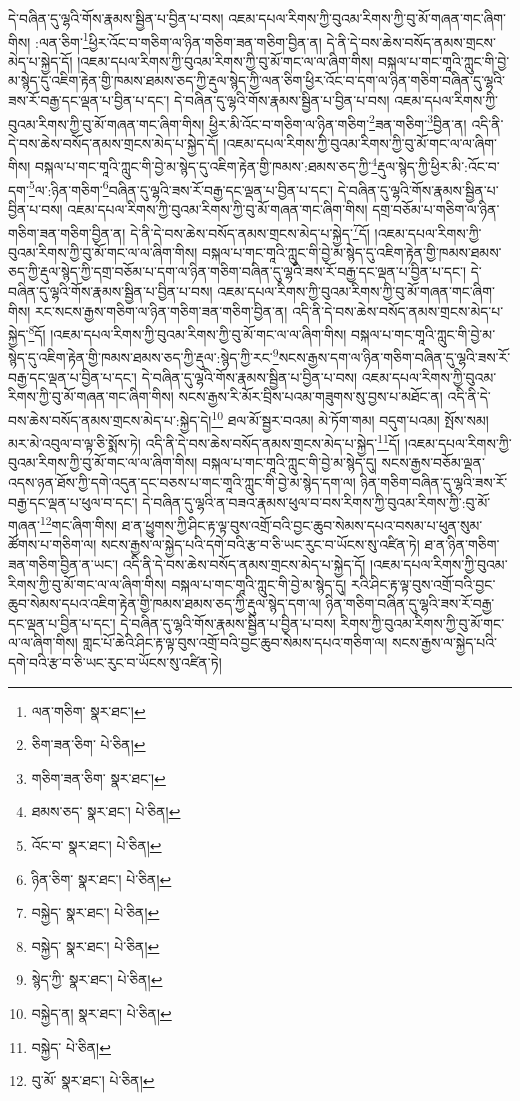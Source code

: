 དེ་བཞིན་དུ་ལྷའི་གོས་རྣམས་སྦྱིན་པ་བྱིན་པ་བས། འཇམ་དཔལ་རིགས་ཀྱི་བུའམ་རིགས་ཀྱི་བུ་མོ་གཞན་གང་ཞིག་གིས། :ལན་ཅིག་\footnote{ལན་གཅིག་  སྣར་ཐང་། }ཕྱིར་འོང་བ་གཅིག་ལ་ཉིན་གཅིག་ཟན་གཅིག་བྱིན་ན། དེ་ནི་དེ་བས་ཆེས་བསོད་ནམས་གྲངས་མེད་པ་སྐྱེད་དོ། །འཇམ་དཔལ་རིགས་ཀྱི་བུའམ་རིགས་ཀྱི་བུ་མོ་གང་ལ་ལ་ཞིག་གིས། བསྐལ་པ་གང་གཱའི་ཀླུང་གི་བྱེ་མ་སྙེད་དུ་འཇིག་རྟེན་གྱི་ཁམས་ཐམས་ཅད་ཀྱི་རྡུལ་སྙེད་ཀྱི་ལན་ཅིག་ཕྱིར་འོང་བ་དག་ལ་ཉིན་གཅིག་བཞིན་དུ་ལྷའི་ཟས་རོ་བརྒྱ་དང་ལྡན་པ་བྱིན་པ་དང་། དེ་བཞིན་དུ་ལྷའི་གོས་རྣམས་སྦྱིན་པ་བྱིན་པ་བས། འཇམ་དཔལ་རིགས་ཀྱི་བུའམ་རིགས་ཀྱི་བུ་མོ་གཞན་གང་ཞིག་གིས། ཕྱིར་མི་འོང་བ་གཅིག་ལ་ཉིན་གཅིག་\footnote{ཅིག་ཟན་ཅིག་  པེ་ཅིན། }ཟན་གཅིག་\footnote{གཅིག་ཟན་ཅིག་  སྣར་ཐང་། }བྱིན་ན། འདི་ནི་དེ་བས་ཆེས་བསོད་ནམས་གྲངས་མེད་པ་སྐྱེད་དོ། །འཇམ་དཔལ་རིགས་ཀྱི་བུའམ་རིགས་ཀྱི་བུ་མོ་གང་ལ་ལ་ཞིག་གིས། བསྐལ་པ་གང་གཱའི་ཀླུང་གི་བྱེ་མ་སྙེད་དུ་འཇིག་རྟེན་གྱི་ཁམས་:ཐམས་ཅད་ཀྱི་\footnote{ཐམས་ཅད་  སྣར་ཐང་།  པེ་ཅིན། }རྡུལ་སྙེད་ཀྱི་ཕྱིར་མི་:འོང་བ་དག་\footnote{འོང་བ་  སྣར་ཐང་།  པེ་ཅིན། }ལ་:ཉིན་གཅིག་\footnote{ཉིན་ཅིག་  སྣར་ཐང་།  པེ་ཅིན། }བཞིན་དུ་ལྷའི་ཟས་རོ་བརྒྱ་དང་ལྡན་པ་བྱིན་པ་དང་། དེ་བཞིན་དུ་ལྷའི་གོས་རྣམས་སྦྱིན་པ་བྱིན་པ་བས། འཇམ་དཔལ་རིགས་ཀྱི་བུའམ་རིགས་ཀྱི་བུ་མོ་གཞན་གང་ཞིག་གིས། དགྲ་བཅོམ་པ་གཅིག་ལ་ཉིན་གཅིག་ཟན་གཅིག་བྱིན་ན། དེ་ནི་དེ་བས་ཆེས་བསོད་ནམས་གྲངས་མེད་པ་སྐྱེད་\footnote{བསྐྱེད་  སྣར་ཐང་།  པེ་ཅིན། }དོ། །འཇམ་དཔལ་རིགས་ཀྱི་བུའམ་རིགས་ཀྱི་བུ་མོ་གང་ལ་ལ་ཞིག་གིས། བསྐལ་པ་གང་གཱའི་ཀླུང་གི་བྱེ་མ་སྙེད་དུ་འཇིག་རྟེན་གྱི་ཁམས་ཐམས་ཅད་ཀྱི་རྡུལ་སྙེད་ཀྱི་དགྲ་བཅོམ་པ་དག་ལ་ཉིན་གཅིག་བཞིན་དུ་ལྷའི་ཟས་རོ་བརྒྱ་དང་ལྡན་པ་བྱིན་པ་དང་། དེ་བཞིན་དུ་ལྷའི་གོས་རྣམས་སྦྱིན་པ་བྱིན་པ་བས། འཇམ་དཔལ་རིགས་ཀྱི་བུའམ་རིགས་ཀྱི་བུ་མོ་གཞན་གང་ཞིག་གིས། རང་སངས་རྒྱས་གཅིག་ལ་ཉིན་གཅིག་ཟན་གཅིག་བྱིན་ན། འདི་ནི་དེ་བས་ཆེས་བསོད་ནམས་གྲངས་མེད་པ་སྐྱེད་\footnote{བསྐྱེད་  སྣར་ཐང་།  པེ་ཅིན། }དོ། །འཇམ་དཔལ་རིགས་ཀྱི་བུའམ་རིགས་ཀྱི་བུ་མོ་གང་ལ་ལ་ཞིག་གིས། བསྐལ་པ་གང་གཱའི་ཀླུང་གི་བྱེ་མ་སྙེད་དུ་འཇིག་རྟེན་གྱི་ཁམས་ཐམས་ཅད་ཀྱི་རྡུལ་:སྙེད་ཀྱི་རང་\footnote{སྙེད་ཀྱི་  སྣར་ཐང་།  པེ་ཅིན། }སངས་རྒྱས་དག་ལ་ཉིན་གཅིག་བཞིན་དུ་ལྷའི་ཟས་རོ་བརྒྱ་དང་ལྡན་པ་བྱིན་པ་དང་། དེ་བཞིན་དུ་ལྷའི་གོས་རྣམས་སྦྱིན་པ་བྱིན་པ་བས། འཇམ་དཔལ་རིགས་ཀྱི་བུའམ་རིགས་ཀྱི་བུ་མོ་གཞན་གང་ཞིག་གིས། སངས་རྒྱས་རི་མོར་བྲིས་པའམ་གཟུགས་སུ་བྱས་པ་མཐོང་ན། འདི་ནི་དེ་བས་ཆེས་བསོད་ནམས་གྲངས་མེད་པ་:སྐྱེད་དེ།\footnote{བསྐྱེད་ན།  སྣར་ཐང་།  པེ་ཅིན། } ཐལ་མོ་སྦྱར་བའམ། མེ་ཏོག་གམ། བདུག་པའམ། སྤོས་སམ། མར་མེ་འབུལ་བ་ལྟ་ཅི་སྨོས་ཏེ། འདི་ནི་དེ་བས་ཆེས་བསོད་ནམས་གྲངས་མེད་པ་སྐྱེད་\footnote{བསྐྱེད་  པེ་ཅིན། }དོ། །འཇམ་དཔལ་རིགས་ཀྱི་བུའམ་རིགས་ཀྱི་བུ་མོ་གང་ལ་ལ་ཞིག་གིས། བསྐལ་པ་གང་གཱའི་ཀླུང་གི་བྱེ་མ་སྙེད་དུ། སངས་རྒྱས་བཅོམ་ལྡན་འདས་ཉན་ཐོས་ཀྱི་དགེ་འདུན་དང་བཅས་པ་གང་གཱའི་ཀླུང་གི་བྱེ་མ་སྙེད་དག་ལ། ཉིན་གཅིག་བཞིན་དུ་ལྷའི་ཟས་རོ་བརྒྱ་དང་ལྡན་པ་ཕུལ་བ་དང་། དེ་བཞིན་དུ་ལྷའི་ན་བཟའ་རྣམས་ཕུལ་བ་བས་རིགས་ཀྱི་བུའམ་རིགས་ཀྱི་:བུ་མོ་གཞན་\footnote{བུ་མོ་  སྣར་ཐང་།  པེ་ཅིན། }གང་ཞིག་གིས། ཐ་ན་ཕྱུགས་ཀྱི་ཤིང་རྟ་ལྟ་བུས་འགྲོ་བའི་བྱང་ཆུབ་སེམས་དཔའ་བསམ་པ་ཕུན་སུམ་ཚོགས་པ་གཅིག་ལ། སངས་རྒྱས་ལ་སྐྱེད་པའི་དགེ་བའི་རྩ་བ་ཅི་ཡང་རུང་བ་ཡོངས་སུ་འཛིན་ཏེ། ཐ་ན་ཉིན་གཅིག་ཟན་གཅིག་བྱིན་ན་ཡང་། འདི་ནི་དེ་བས་ཆེས་བསོད་ནམས་གྲངས་མེད་པ་སྐྱེད་དོ། །འཇམ་དཔལ་རིགས་ཀྱི་བུའམ་རིགས་ཀྱི་བུ་མོ་གང་ལ་ལ་ཞིག་གིས། བསྐལ་པ་གང་གཱའི་ཀླུང་གི་བྱེ་མ་སྙེད་དུ། རའི་ཤིང་རྟ་ལྟ་བུས་འགྲོ་བའི་བྱང་ཆུབ་སེམས་དཔའ་འཇིག་རྟེན་གྱི་ཁམས་ཐམས་ཅད་ཀྱི་རྡུལ་སྙེད་དག་ལ། ཉིན་གཅིག་བཞིན་དུ་ལྷའི་ཟས་རོ་བརྒྱ་དང་ལྡན་པ་བྱིན་པ་དང་། དེ་བཞིན་དུ་ལྷའི་གོས་རྣམས་སྦྱིན་པ་བྱིན་པ་བས། རིགས་ཀྱི་བུའམ་རིགས་ཀྱི་བུ་མོ་གང་ལ་ལ་ཞིག་གིས། གླང་པོ་ཆེའི་ཤིང་རྟ་ལྟ་བུས་འགྲོ་བའི་བྱང་ཆུབ་སེམས་དཔའ་གཅིག་ལ། སངས་རྒྱས་ལ་སྐྱེད་པའི་དགེ་བའི་རྩ་བ་ཅི་ཡང་རུང་བ་ཡོངས་སུ་འཛིན་ཏེ། 